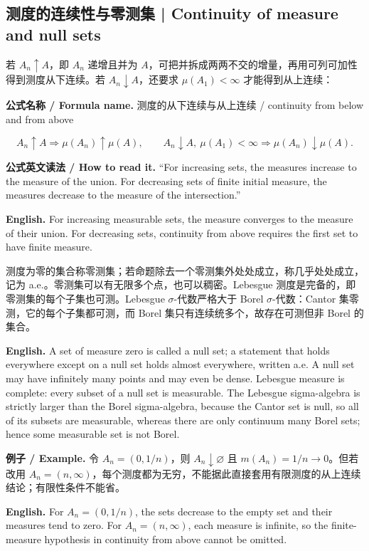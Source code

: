 \documentclass[UTF8,11pt,a4paper]{ctexart}
\newcommand{\EN}[1]{\par\noindent\textbf{English.} #1\par}
\newcommand{\READ}[1]{\par\noindent\textbf{公式英文读法 / How to read it.} #1\par}
\let\APSsubsection\subsection
\renewcommand{\subsection}[1]{\Needspace{6\baselineskip}\APSsubsection{#1}}
\newcommand{\FORMULA}[2]{\par\Needspace{3\baselineskip}\noindent\textbf{公式名称 / Formula name.} #1 / #2\par}
\newcommand{\EX}[2]{\par\noindent\textbf{例子 / Example.} #1\par\EN{#2}}
\begin{document}
\subsection{测度的连续性与零测集 | Continuity of measure and null sets}
\noindent 若 $A_n\uparrow A$，即 $A_n$ 递增且并为 $A$，可把并拆成两两不交的增量，再用可列可加性得到测度从下连续。若 $A_n\downarrow A$，还要求 $\mu(A_1)<\infty$ 才能得到从上连续：
\FORMULA{测度的从下连续与从上连续}{continuity from below and from above}
\[
A_n\uparrow A\Longrightarrow\mu(A_n)\uparrow\mu(A),
\qquad
A_n\downarrow A,\ \mu(A_1)<\infty
\Longrightarrow\mu(A_n)\downarrow\mu(A).
\]
\READ{“For increasing sets, the measures increase to the measure of the union. For decreasing sets of finite initial measure, the measures decrease to the measure of the intersection.”}
\EN{For increasing measurable sets, the measure converges to the measure of their union. For decreasing sets, continuity from above requires the first set to have finite measure.}
\noindent 测度为零的集合称零测集；若命题除去一个零测集外处处成立，称几乎处处成立，记为 a.e.。零测集可以有无限多个点，也可以稠密。Lebesgue 测度是完备的，即零测集的每个子集也可测。Lebesgue $\sigma$-代数严格大于 Borel $\sigma$-代数：Cantor 集零测，它的每个子集都可测，而 Borel 集只有连续统多个，故存在可测但非 Borel 的集合。
\EN{A set of measure zero is called a null set; a statement that holds everywhere except on a null set holds almost everywhere, written a.e. A null set may have infinitely many points and may even be dense. Lebesgue measure is complete: every subset of a null set is measurable. The Lebesgue sigma-algebra is strictly larger than the Borel sigma-algebra, because the Cantor set is null, so all of its subsets are measurable, whereas there are only continuum many Borel sets; hence some measurable set is not Borel.}
\EX{令 $A_n=(0,1/n)$，则 $A_n\downarrow\varnothing$ 且 $m(A_n)=1/n\to0$。但若改用 $A_n=(n,\infty)$，每个测度都为无穷，不能据此直接套用有限测度的从上连续结论；有限性条件不能省。}{For $A_n=(0,1/n)$, the sets decrease to the empty set and their measures tend to zero. For $A_n=(n,\infty)$, each measure is infinite, so the finite-measure hypothesis in continuity from above cannot be omitted.}
\end{document}
